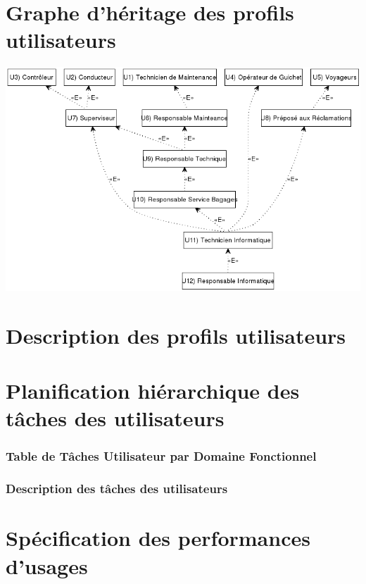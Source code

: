 \part{Graphe d'héritage des profils utilisateurs}
\begin{center}
\includegraphics[width=\linewidth]{../../GPU/src/img/GPU.png}
\end{center}
\newpage

\part{Description des profils utilisateurs}

\newpage

\part{Planification hiérarchique des tâches des utilisateurs}
\section{Table de Tâches Utilisateur par Domaine Fonctionnel}
\begin{center}
    
\end{center}

\section{Description des tâches des utilisateurs}

\newpage

\part{Spécification des performances d'usages}



